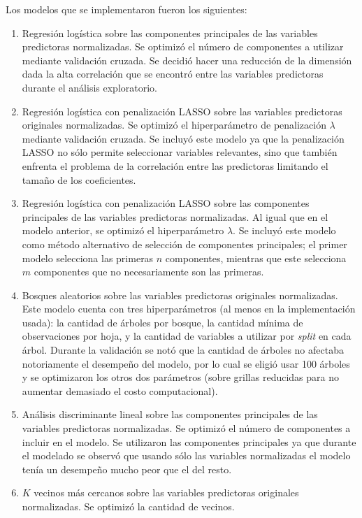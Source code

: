 
Los modelos que se implementaron fueron los siguientes:

\begin{enumerate}

  \item Regresión logística sobre las componentes principales de las variables
    predictoras normalizadas. Se optimizó el número de componentes a utilizar
    mediante validación cruzada. Se decidió hacer una reducción de la dimensión
    dada la alta correlación que se encontró entre las variables predictoras
    durante el análisis exploratorio.
  \item Regresión logística con penalización LASSO sobre las variables
    predictoras originales normalizadas. Se optimizó el hiperparámetro de
    penalización $\lambda$ mediante validación cruzada. Se incluyó este modelo
    ya que la penalización LASSO no sólo permite seleccionar variables
    relevantes, sino que también enfrenta el problema de la correlación entre
    las predictoras limitando el tamaño de los coeficientes.
  \item Regresión logística con penalización LASSO sobre las componentes
    principales de las variables predictoras normalizadas. Al igual que en el
    modelo anterior, se optimizó el hiperparámetro $\lambda$. Se incluyó este
    modelo como método alternativo de selección de componentes principales; el
    primer modelo selecciona las primeras $n$ componentes, mientras que este
    selecciona $m$ componentes que no necesariamente son las primeras.
  \item Bosques aleatorios sobre las variables predictoras originales
    normalizadas. Este modelo cuenta con tres hiperparámetros (al menos en la
    implementación usada): la cantidad de árboles por bosque, la cantidad
    mínima de observaciones por hoja, y la cantidad de variables a utilizar por
    \textit{split} en cada árbol. Durante la validación se notó que la cantidad
    de árboles no afectaba notoriamente el desempeño del modelo, por lo cual se
    eligió usar 100 árboles y se optimizaron los otros dos parámetros (sobre
    grillas reducidas para no aumentar demasiado el costo computacional).
  \item Análisis discriminante lineal sobre las componentes principales de las
    variables predictoras normalizadas. Se optimizó el número de componentes a
    incluir en el modelo. Se utilizaron las componentes principales ya que
    durante el modelado se observó que usando sólo las variables normalizadas
    el modelo tenía un desempeño mucho peor que el del resto.
  \item $K$ vecinos más cercanos sobre las variables predictoras originales
    normalizadas. Se optimizó la cantidad de vecinos.

\end{enumerate}
